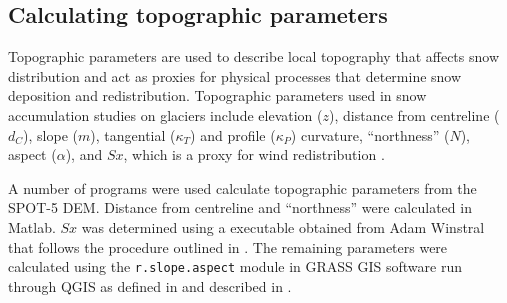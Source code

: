 \documentclass[12pt]{article}
\begin{document}
\subsection{Calculating topographic parameters}

Topographic parameters are used to describe local topography that affects snow distribution and act as proxies for physical processes that determine snow deposition and redistribution. Topographic parameters used in snow accumulation studies on glaciers include elevation ($z$), distance from centreline ($d_C$), slope ($m$), tangential ($\kappa_T$) and profile ($\kappa_P$) curvature, ``northness'' ($N$), aspect ($\alpha$), and $Sx$, which is a proxy for wind redistribution \citep{Basist1994, Revuelto2014, McGrath2015}.	
 
A number of programs were used calculate topographic parameters from the SPOT-5 DEM. Distance from centreline and ``northness'' were calculated in Matlab. $Sx$ was determined using a executable obtained from Adam Winstral that follows the procedure outlined in \cite{Winstral2002}. The remaining parameters were calculated using the \texttt{r.slope.aspect} module in GRASS GIS software run through QGIS as defined in \cite{Mitavsova1993} and described in \cite{Hofierka2009}. 
\end{document}
